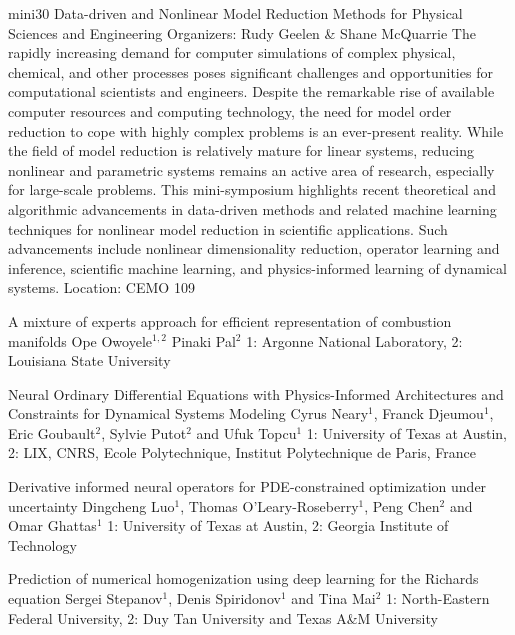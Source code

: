 \mini
{mini30}
{Data-driven and Nonlinear Model Reduction Methods for Physical Sciences and Engineering}
{Organizers: Rudy Geelen \& Shane McQuarrie}
{The rapidly increasing demand for computer simulations of complex physical, chemical, and other processes poses significant challenges and opportunities for computational scientists and engineers. Despite the remarkable rise of available computer resources and computing technology, the need for model order reduction to cope with highly complex problems is an ever-present reality. While the field of model reduction is relatively mature for linear systems, reducing nonlinear and parametric systems remains an active area of research, especially for large-scale problems. This mini-symposium highlights recent theoretical and algorithmic advancements in data-driven methods and related machine learning techniques for nonlinear model reduction in scientific applications. Such advancements include nonlinear dimensionality reduction, operator learning and inference, scientific machine learning, and physics-informed learning of dynamical systems.}
{Location: CEMO 109}

\begin{talks}
\item\talk
{A mixture of experts approach for efficient representation of combustion manifolds}
{Ope Owoyele$^{1,2}$ Pinaki Pal$^2$}
{1: Argonne National Laboratory, 2: Louisiana State University}
\item\talk
{Neural Ordinary Differential Equations with Physics-Informed Architectures and Constraints for Dynamical Systems Modeling}
{Cyrus Neary$^1$, Franck Djeumou$^1$, Eric Goubault$^2$, Sylvie Putot$^2$ and Ufuk Topcu$^1$}
{1: University of Texas at Austin, 2: LIX, CNRS, Ecole Polytechnique, Institut Polytechnique de Paris, France}
\item\talk
{Derivative informed neural operators for PDE-constrained optimization under uncertainty}
{Dingcheng Luo$^1$, Thomas O'Leary-Roseberry$^1$, Peng Chen$^2$ and Omar Ghattas$^1$}
{1: University of Texas at Austin, 2: Georgia Institute of Technology}
\item\talk
{Prediction of numerical homogenization using deep learning for the Richards equation}
{Sergei Stepanov$^1$, Denis Spiridonov$^1$ and Tina Mai$^2$}
{1: North-Eastern Federal University, 2: Duy Tan University and Texas A\&M University}
\end{talks}
\room
